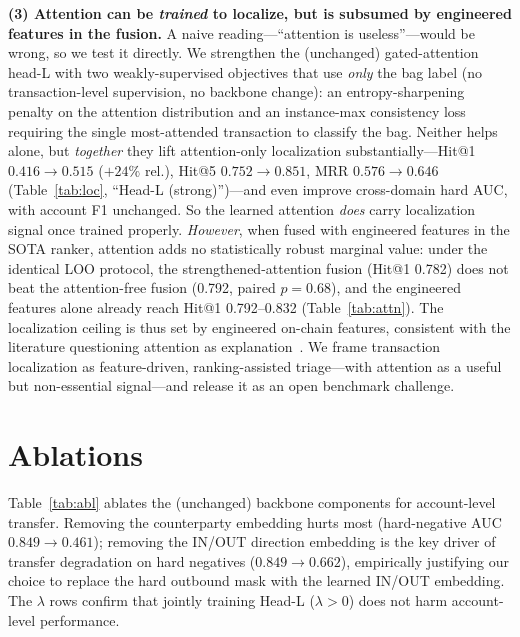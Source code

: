 \documentclass[conference]{IEEEtran}
\begin{document}
\noindent\textbf{(3) Attention can be \emph{trained} to localize, but is
subsumed by engineered features in the fusion.} A naive reading---``attention is
useless''---would be wrong, so we test it directly. We strengthen the (unchanged)
gated-attention head-L with two weakly-supervised objectives that use \emph{only}
the bag label (no transaction-level supervision, no backbone change): an
entropy-sharpening penalty on the attention distribution and an instance-max
consistency loss requiring the single most-attended transaction to classify the bag.
Neither helps alone, but \emph{together} they lift attention-only localization
substantially---Hit@1 $0.416\!\rightarrow\!0.515$ ($+24\%$ rel.), Hit@5
$0.752\!\rightarrow\!0.851$, MRR $0.576\!\rightarrow\!0.646$ (Table~\ref{tab:loc},
``Head-L (strong)'')---and even improve cross-domain hard AUC, with account F1
unchanged. So the learned attention \emph{does} carry localization signal once
trained properly. \emph{However}, when fused with engineered features in the SOTA
ranker, attention adds no statistically robust marginal value: under the identical
LOO protocol, the strengthened-attention fusion (Hit@1 0.782) does not beat the
attention-free fusion (0.792, paired $p{=}0.68$), and the engineered features alone
already reach Hit@1 0.792--0.832 (Table~\ref{tab:attn}). The localization ceiling is
thus set by engineered on-chain features, consistent with the literature questioning
attention as explanation~\cite{jain2019}. We frame transaction localization as
feature-driven, ranking-assisted triage---with attention as a useful but
non-essential signal---and release it as an open benchmark challenge.

\section{Ablations}
Table~\ref{tab:abl} ablates the (unchanged) backbone components for account-level
transfer. Removing the counterparty embedding hurts most (hard-negative AUC
$0.849{\rightarrow}0.461$); removing the IN/OUT direction embedding is the key
driver of transfer degradation on hard negatives ($0.849{\rightarrow}0.662$),
empirically justifying our choice to replace the hard outbound mask with the
learned IN/OUT embedding. The $\lambda$ rows confirm that jointly training Head-L
($\lambda{>}0$) does not harm account-level performance.
\end{document}
